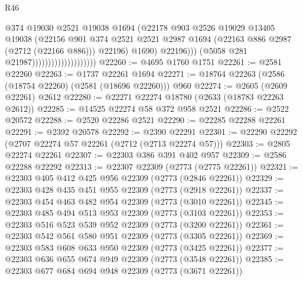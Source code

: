 \begin{lexlean}{R46}
\begin{coremodule}
                                                @374
                                                @19030
                                                @2521
                                                @19038
                                                @1694
                                                (@22178
                                                  @903
                                                  @2526
                                                  @19029
                                                  @13405
                                                  @19038
                                                  (@22156
                                                    @901
                                                    @374
                                                    @2521
                                                    @2521
                                                    @2987
                                                    @1694
                                                    (@22163 @886 @2987 (@2712 (@22166 @886)))
                                                    @22196)
                                                  @1690)
                                                @22196)))
                                          (@5058 @281 @21987))))))))))))))))))))
@22260 := @4695 @1760 @1751
@22261 := @2581 @22260
@22263 := @1737 @22261 @1694
@22271 := @18764 @22263 (@2586 (@18754 @22260) (@2581 (@18696 @22260))) @960
@22274 := @2605 (@2609 @22261) @2612
@22280 := @22271 @22274 @18780 (@2633 (@18783 @22263 @2612))
@22285 := @14525 @22274 @58 @372 @958 @2521
@22286 := @2522 @20572
@22288 := @2520 @22286 @2521
@22290 := @22285 @22288 @22261
@22291 := @2392 @20578
@22292 := @2390 @22291
@22301 := @22290 @22292 (@2707 @22274 @57 @22261 (@2712 (@2713 @22274 @57)))
@22303 := @2805 @22274 @22261
@22307 := @22303 @386 @391 @402 @957
@22309 := @2586 @22288 @22292
@22313 := @22307 @22309 (@2773 (@2775 @22261))
@22321 := @22303 @405 @412 @425 @956 @22309 (@2773 (@2846 @22261))
@22329 := @22303 @428 @435 @451 @955 @22309 (@2773 (@2918 @22261))
@22337 := @22303 @454 @463 @482 @954 @22309 (@2773 (@3010 @22261))
@22345 := @22303 @485 @494 @513 @953 @22309 (@2773 (@3103 @22261))
@22353 := @22303 @516 @523 @539 @952 @22309 (@2773 (@3200 @22261))
@22361 := @22303 @542 @561 @580 @951 @22309 (@2773 (@3305 @22261))
@22369 := @22303 @583 @608 @633 @950 @22309 (@2773 (@3425 @22261))
@22377 := @22303 @636 @655 @674 @949 @22309 (@2773 (@3548 @22261))
@22385 := @22303 @677 @684 @694 @948 @22309 (@2773 (@3671 @22261))

\end{coremodule}
\end{lexlean}
